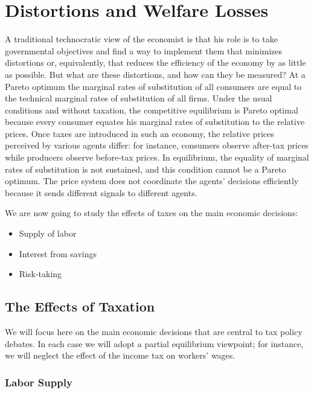 

\chapter{Distortions and Welfare Losses} \label{ch1_distortions_welfarelosses}

A traditional technocratic view of the economist is that his role is to take governmental objectives and find a way to implement them that minimizes distortions or, equivalently, that reduces the efficiency of the economy by as little as possible. But what are these distortions, and how can they be measured? At a Pareto optimum the marginal rates of substitution of all consumers are equal to the technical marginal rates of substitution of all firms. Under the usual conditions and without taxation, the competitive equilibrium is Pareto optimal because every consumer equates his marginal rates of substitution to the relative prices. Once taxes are introduced in such an economy, the relative prices perceived by various agents differ: for instance, consumers observe after-tax prices while producers observe before-tax prices. In equilibrium, the equality of marginal rates of substitution is not sustained, and this condition cannot be a Pareto optimum. The price system does not coordinate the agents' decisions efficiently because it sends different signals to different agents.

We are now going to study the effects of taxes on the main economic decisions:
\begin{itemize}[topsep=0pt, leftmargin=20pt, itemsep=0pt]
	\setlength{\parskip}{10pt} 
	\item Supply of labor 
	\item Interest from savings
	\item Risk-taking
\end{itemize}

\section{The Effects of Taxation}

We will focus here on the main economic decisions that are central to tax policy debates. In each case we will adopt a partial equilibrium viewpoint; for instance, we will neglect the effect of the income tax on workers' wages.

\subsection{Labor Supply}

